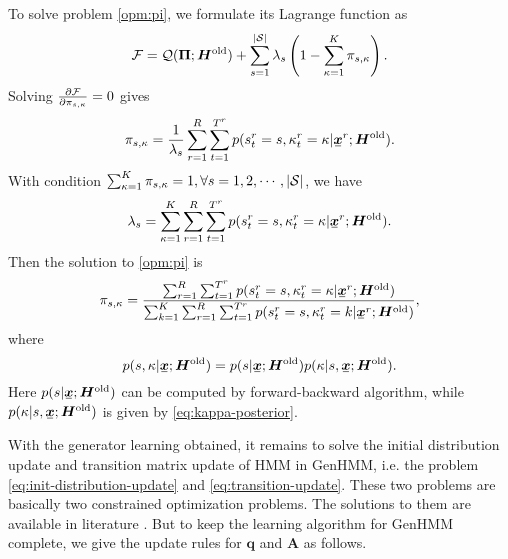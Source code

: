 To solve problem \eqref{opm:pi}, we formulate its Lagrange function as
\begin{equation}
  \mathcal{F} = \mathcal{Q}(\bm{\Pi}; \bm{H}^{\mathrm{old}}) + \sum_{s=1}^{|\mathcal{S}|} \lambda_s\left( 1-  \sum_{\kappa=1}^{K}\pi_{s, \kappa}  \right).
\end{equation}
Solving $\frac{ \partial \mathcal{F}}{\partial \pi_{s, \kappa}} = 0$ gives
\begin{equation}
  \pi_{s,\kappa} = \frac{1}{\lambda_s}\sum_{r=1}^{R} \sum_{t=1}^{{T}^{r}} p(\smtr{s}{t}{r}=s, \smtr{\kappa}{t}{r} =\kappa| \ubmr{x}{r}; \bm{H}^{\mathrm{old}}).
\end{equation}
With condition $\sum_{\kappa=1}^{K} \pi_{s, \kappa}= 1, \forall s = 1, 2, \cdots, |\mathcal{S}|$, we have
\begin{equation}
  \lambda_s = \sum_{\kappa=1}^{K}\sum_{r=1}^{R} \sum_{t=1}^{{T}^{r}} p(\smtr{s}{t}{r}=s, \smtr{\kappa}{t}{r} =\kappa | \ubmr{x}{r}; \bm{H}^{\mathrm{old}}).
\end{equation}
Then the solution to \eqref{opm:pi} is
\begin{equation}\label{eq:mix-latent-parameter-solution}
  \pi_{s, \kappa} = \frac{\sum_{r=1}^{R} \sum_{t=1}^{{T}^{r}} p(\smtr{s}{t}{r} =s, \smtr{\kappa}{t}{r}=\kappa | \ubmr{x}{r}; \bm{H}^{\mathrm{old}}) }{\sum_{k =1}^{K}\sum_{r=1}^{R} \sum_{t=1}^{{T}^{r}} p(\smtr{s}{t}{r} =s, \smtr{\kappa}{t}{r}=k | \ubmr{x}{r}; \bm{H}^{\mathrm{old}}) },
\end{equation}
where
\begin{equation}
  p(s, \kappa | \ubm{x}; \bm{H}^{\mathrm{old}}) = p(s| \ubm{x}; \bm{H}^{\mathrm{old}}) p(\kappa | s, \ubm{x}; \bm{H}^{\mathrm{old}}).
\end{equation}
Here $p(s| \ubm{x}; \bm{H}^{\mathrm{old}})$ can be computed by forward-backward algorithm, while $p(\kappa | s, \ubm{x}; \bm{H}^{\mathrm{old}})$ is given by \eqref{eq:kappa-posterior}.


With the generator learning obtained, it remains to solve the initial distribution update and transition matrix update of HMM in GenHMM, i.e. the problem \eqref{eq:init-distribution-update} and \eqref{eq:transition-update}. These two problems are basically two constrained optimization problems. The solutions to them are available in literature \cite{Bishop:2006:PRM:1162264}. But to keep the learning algorithm for GenHMM complete, we give the update rules for $\bm{q}$ and $\bm{A}$ as follows.

